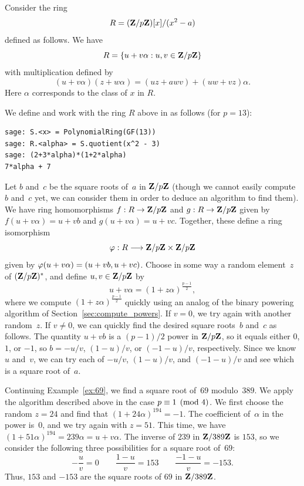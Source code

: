 Consider the ring
$$R = (\mathbf{Z}/p\mathbf{Z}{})[x]/(x^2 - a)$$
defined as follows.
We have
$$
R = \{ u + v \alpha : u, v \in \mathbf{Z}/p\mathbf{Z}{}\}
$$
with multiplication defined by
$$
(u+v\alpha)(z+w\alpha) = (uz + awv) + (uw+vz)\alpha.
$$
Here $\alpha$ corresponds to the class of $x$ in $R$.
\begin{sg}
We define and work with the ring $R$ above
in \sage as follows (for $p=13$):
\begin{verbatim}
sage: S.<x> = PolynomialRing(GF(13))
sage: R.<alpha> = S.quotient(x^2 - 3)
sage: (2+3*alpha)*(1+2*alpha)
7*alpha + 7
\end{verbatim}
\end{sg}


Let $b$ and~$c$ be the square roots of~$a$ in $\mathbf{Z}/p\mathbf{Z}{}$
(though we cannot easily
compute~$b$ and~$c$ yet, we can consider them in order
to deduce an algorithm to find them).
We have ring homomorphisms
$f:R\to \mathbf{Z}/p\mathbf{Z}{}$ and $g:R\to \mathbf{Z}/p\mathbf{Z}{}$
given by $f(u+v\alpha) = u+vb$ and $g(u+v\alpha) = u + vc$.
Together, these define a ring isomorphism
$$
  \varphi : R \longrightarrow \mathbf{Z}/p\mathbf{Z}{} \times \mathbf{Z}/p\mathbf{Z}{}
$$
given by $\varphi(u+v\alpha) = (u+vb,u+vc)$.
Choose in some way a random element~$z$ of $(\mathbf{Z}/p\mathbf{Z}{})^*$, and
define $u,v\in\mathbf{Z}/p\mathbf{Z}{}$ by
$$
u+v\alpha = (1+z\alpha)^{\frac{p-1}{2}},
$$
where we compute $(1+z\alpha)^{\frac{p-1}{2}}$ quickly
using an analog of the
binary powering algorithm of Section~\ref{sec:compute_powers}.
If $v=0$, we try again with another random~$z$.  If $v\neq 0$, we can
quickly find the desired square roots~$b$ and~$c$ as follows.  The
quantity $u+vb$ is a $(p-1)/2$ power in $\mathbf{Z}/p\mathbf{Z}{}$, so it equals
either $0$, $1$, or $-1$, so $b = -u/v$, $(1-u)/v$, or $(-1-u)/v$,
respectively.  Since we know~$u$ and~$v$, we can try each of $-u/v$,
$(1-u)/v$, and $(-1-u)/v$ and see which is a square root of~$a$.

\begin{example}\label{ex:69sqrt}
Continuing Example~\ref{ex:69},
we find a square root of~$69$ modulo~$389$.
We apply the algorithm described above in the case $p\equiv 1\pmod{4}$.
We first choose the random $z=24$ and find that
$
 (1+24\alpha)^{194} = -1.
$
The coefficient of~$\alpha$ in the power is~$0$, and we try again with
$z=51$.
This time, we have $(1+51\alpha)^{194} = 239\alpha = u +v\alpha$.
The inverse of $239$ in $\mathbf{Z}/389\mathbf{Z}{}$ is $153$, so we consider the
following three possibilities for a square root of~$69$:
$$
  -\frac{u}{v} = 0 \qquad
  \frac{1-u}{v} = 153\qquad
  \frac{-1-u}{v} = -153.
$$
Thus, $153$ and $-153$ are the square roots of $69$ in $\mathbf{Z}/389\mathbf{Z}{}$.
\end{example}


